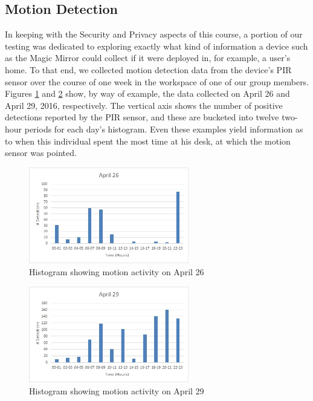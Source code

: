 \documentclass[conference]{IEEEtran}
\begin{document}
\subsection{Motion Detection}
In keeping with the Security and Privacy aspects of this course, a portion of our testing was dedicated to exploring exactly what kind of information a device such as the Magic Mirror could collect if it were deployed in, for example, a user's home.
To that end, we collected motion detection data from the device's PIR sensor over the course of one week in the workspace of one of our group members.
Figures \ref{fig:chart26} and \ref{fig:chart29} show, by way of example, the data collected on April 26 and April 29, 2016, respectively.
The vertical axis shows the number of positive detections reported by the PIR sensor, and these are bucketed into twelve two-hour periods for each day's histogram.
Even these examples yield information as to when this individual spent the most time at his desk, at which the motion sensor was pointed.
\begin{figure}[!ht]
  \centering
  \includegraphics[width=2.75in]{images/Chart-April26.jpg}
  \caption{Histogram showing motion activity on April 26}
  \label{fig:chart26}
\end{figure}

\begin{figure}[!ht]
  \centering
  \includegraphics[width=2.75in]{images/Chart-April29.jpg}
  \caption{Histogram showing motion activity on April 29}
  \label{fig:chart29}
\end{figure}
\end{document}

